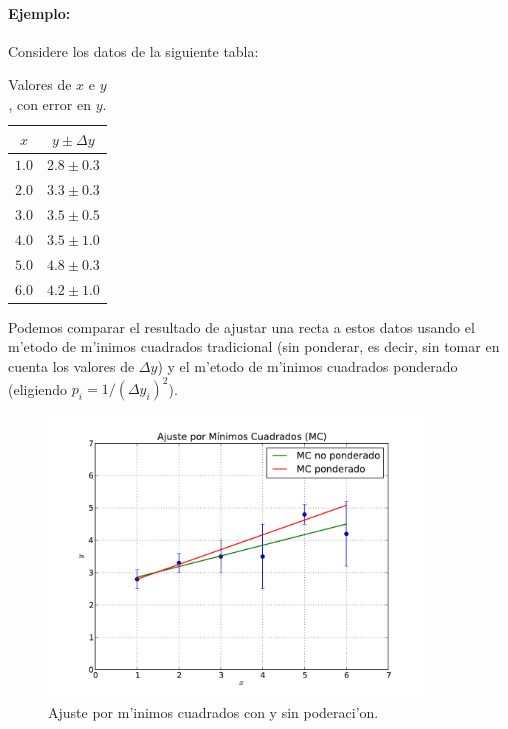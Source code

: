 \paragraph{Ejemplo:} Considere los datos de la siguiente tabla:
\begin{table}[h!]
\begin{center}
\begin{tabular}{c|c}
$x$ & $y\pm\Delta y$ \\ \hline
$1.0$ & $2.8\pm 0.3$ \\ \hline 
$2.0$ & $3.3\pm 0.3$ \\ \hline
$3.0$ & $3.5\pm 0.5$ \\ \hline
$4.0$ & $3.5\pm 1.0$ \\ \hline
$5.0$ & $4.8\pm 0.3$\\ \hline
$6.0$ & $4.2\pm 1.0$ 
\end{tabular}
\caption{Valores de $x$ e $y$, con error en $y$.}
\label{tab-xyDy}
\end{center}
\end{table}
Podemos comparar el resultado de ajustar una recta a estos datos usando el m'etodo de m'inimos cuadrados tradicional (sin ponderar, es decir, sin tomar en cuenta los valores de $\Delta y$) y el m'etodo de m'inimos cuadrados ponderado (eligiendo $p_i=1/(\Delta y_{i})^2$).
\begin{figure}[h!]
\begin{center}
\includegraphics[width=10cm]{figs/fig-mc-ponderado.pdf}
\caption{Ajuste por m'inimos cuadrados con y sin poderaci'on.}
\end{center}
\end{figure}

